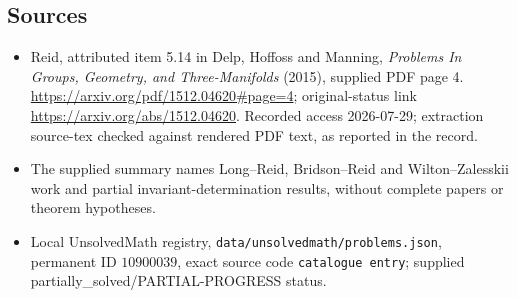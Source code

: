 \documentclass[11pt]{article}
\begin{document}
\subsection{Sources}
\begin{itemize}
\item Reid, attributed item 5.14 in Delp, Hoffoss and Manning, \emph{Problems In Groups, Geometry, and Three-Manifolds} (2015), supplied PDF page 4. \url{https://arxiv.org/pdf/1512.04620#page=4}; original-status link \url{https://arxiv.org/abs/1512.04620}. Recorded access 2026-07-29; extraction source-tex checked against rendered PDF text, as reported in the record.
\item The supplied summary names Long--Reid, Bridson--Reid and Wilton--Zalesskii work and partial invariant-determination results, without complete papers or theorem hypotheses.
\item Local UnsolvedMath registry, \texttt{data/unsolvedmath/problems.json}, permanent ID \(10900039\), exact source code \texttt{catalogue entry}; supplied partially\_solved/PARTIAL-PROGRESS status.
\end{itemize}
\end{document}
